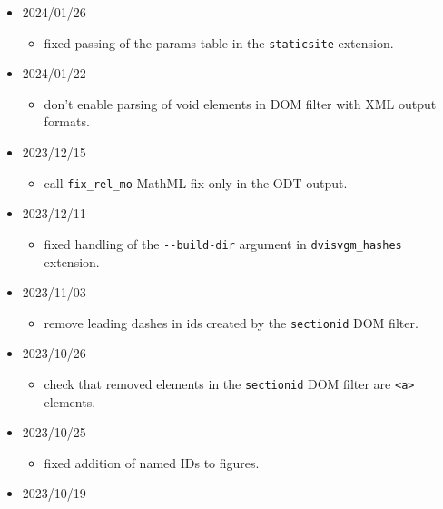 \begin{itemize}
  \begin{itemize}
  \tightlist
  \item
    add standalone minus sign to the
    \texttt{\textless{}mn\textgreater{}} element in MathML.
  \end{itemize}
\item
  2024/01/26

  \begin{itemize}
  \tightlist
  \item
    fixed passing of the params table in the \texttt{staticsite}
    extension.
  \end{itemize}
\item
  2024/01/22

  \begin{itemize}
  \tightlist
  \item
    don't enable parsing of void elements in DOM filter with XML output
    formats.
  \end{itemize}
\item
  2023/12/15

  \begin{itemize}
  \tightlist
  \item
    call \texttt{fix\_rel\_mo} MathML fix only in the ODT output.
  \end{itemize}
\item
  2023/12/11

  \begin{itemize}
  \tightlist
  \item
    fixed handling of the \texttt{-\/-build-dir} argument in
    \texttt{dvisvgm\_hashes} extension.
  \end{itemize}
\item
  2023/11/03

  \begin{itemize}
  \tightlist
  \item
    remove leading dashes in ids created by the \texttt{sectionid} DOM
    filter.
  \end{itemize}
\item
  2023/10/26

  \begin{itemize}
  \tightlist
  \item
    check that removed elements in the \texttt{sectionid} DOM filter are
    \texttt{\textless{}a\textgreater{}} elements.
  \end{itemize}
\item
  2023/10/25

  \begin{itemize}
  \tightlist
  \item
    fixed addition of named IDs to figures.
  \end{itemize}
\item
  2023/10/19


\end{itemize}
